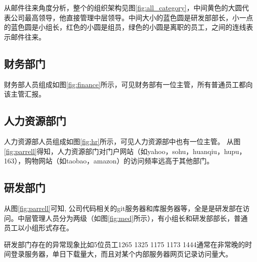 \documentclass[journal]{vgtc}                %
\begin{document}
从邮件往来角度分析，整个的组织架构见图\ref{fig:all_category}，中间黄色的大圆代表公司最高领导，他直接管理中层领导。中间大小的蓝色圆是研发部部长，小一点的蓝色圆是小组长，红色的小圆是组员，绿色的小圆是离职的员工，之间的连线表示邮件往来。

\subsection{财务部门}
财务部人员组成如图\ref{fig:finance}所示，可见财务部有一位主管，所有普通员工都向该主管汇报。

\subsection{人力资源部门}
人力资源部人员组成如图\ref{fig:hr}所示，可见人力资源部中也有一位主管。
从图\ref{fig:parrell}得知，人力资源部门对门户网站（如yahoo，sohu，huanqiu，hupu，163），购物网站（如taobao，amazon）的访问频率远高于其他部门。
\subsection{研发部门}
从图\ref{fig:parrell}可知, 公司代码相关的git服务器和库服务器等，全是是研发部在访问。中层管理人员分为两级（如图\ref{fig:med}所示），有小组长和研发部部长，普通员工以小组形式存在。

研发部门存在的异常现象比如5位员工{1265} {1325 1175} {1173} {1444}通常在非常晚的时间登录服务器，单日下载量大，而且对某个内部服务器网页记录访问量大。




%

%
%
%


\end{document}
